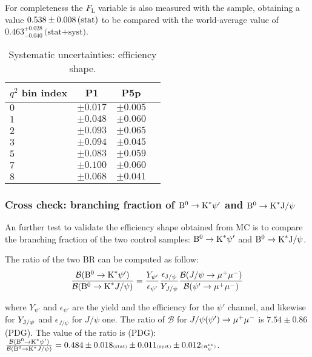 For completeness the $F_\mathrm{L}$ variable is also measured with the \BKsPsip sample, obtaining a value $0.538 \pm 0.008\,\textrm{(stat)}$ to be compared with the world-average value of $0.463^{+0.028}_{-0.040}\,\text{(stat+syst)}$.

\begin{table*}[!htb]
  \begin {center}
    \begin{small}
      \caption{Systematic uncertainties: efficiency shape.
        \label{tab:eff.shape}}
      \begin{tabular}{|l|c|c|c|}
        \hline
        $q^2$ bin index  & P1 & P5p  \\
        \hline
        $ 0 $ & $\pm0.017$ & $\pm0.005$ \\
        $ 1 $ & $\pm0.048$ & $\pm0.060$ \\
        $ 2 $ & $\pm0.093$ & $\pm0.065$ \\
        $ 3 $ & $\pm0.094$ & $\pm0.045$ \\
        $ 5 $ & $\pm0.083$ & $\pm0.059$ \\
        $ 7 $ & $\pm0.100$ & $\pm0.060$ \\
        $ 8 $ & $\pm0.068$ & $\pm0.041$ \\
        \hline
      \end{tabular}
    \end{small}
  \end{center}
\end{table*}

\subsubsection{Cross check: branching fraction of ${\textrm{B}}{}^{0}\to\textrm{K}^\ast\psi'$ and ${\textrm{B}}{}^{0}\to\textrm{K}^\ast\textrm{J}/\psi$ }

An further test to validate the efficiency shape obtained from MC is to compare the branching fraction of the two control samples: ${\textrm{B}}{}^{0}\to\textrm{K}^\ast\psi'$ and ${\textrm{B}}{}^{0}\to\textrm{K}^\ast\textrm{J}/\psi$.

The ratio of the two BR can be computed as follow:
\begin{equation}\label{RBRatio}
  \frac{\mathcal{B}({\textrm{B}}{}^{0}\to\textrm{K}^\ast\psi')}{\mathcal{B}({\textrm{B}}{}^{0}\to\textrm{K}^\ast J/\psi)}
  = \frac{Y_{\psi'}}{\epsilon_{\psi'}}\frac{\epsilon_{\textrm{J}/\psi}}{Y_{J/\psi}}
  \frac{\mathcal{B}(J/\psi \to \mu^{+} \mu^{-})}{\mathcal{B}(\psi' \to \mu^{+} \mu^{-})}
\end{equation}

where $Y_{\psi'}$ and $\epsilon_{\psi'}$ are the yield and the efficiency for the $\psi'$ channel, and likewise for $Y_{\textrm{J}/\psi}$ and $\epsilon_{J/\psi}$ for $J/\psi$ one.
The ratio of $\mathcal{B}$ for $J/\psi(\psi') \to \mu^{+} \mu^{-}$ is $7.54\pm0.86$ (PDG).
The value of the ratio is (PDG): $\frac{\mathcal{B}({\textrm{B}}{}^{0}\to\textrm{K}^\ast\psi')}{\mathcal{B}({\textrm{B}}{}^{0}\to\textrm{K}^\ast J/\psi)}=0.484 \pm 0.018 \textrm{\tiny{(stat)}} \pm 0.011 \textrm{\tiny{(syst)}} \pm 0.012 \textrm{\tiny{($R^{ee}_\psi$)}}$.

